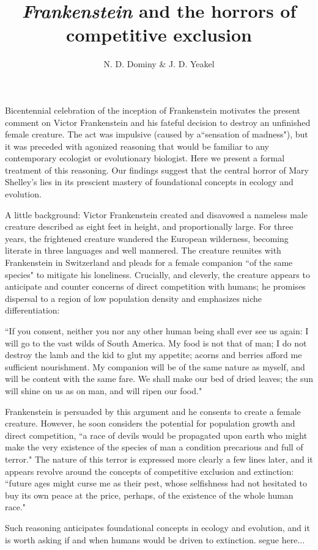\documentclass{article}[11pt]
\begin{document}
\title{\emph{Frankenstein} and the horrors of competitive exclusion}


\author{N. D. Dominy \& J. D. Yeakel}

%
%


\maketitle

Bicentennial celebration of the inception of Frankenstein motivates the present comment on Victor Frankenstein and his fateful decision to destroy an unfinished female creature. The act was impulsive (caused by a``sensation of madness"), but it was preceded with agonized reasoning that would be familiar to any contemporary ecologist or evolutionary biologist. Here we present a formal treatment of this reasoning. Our findings suggest that the central horror of Mary Shelley's lies in its prescient mastery of foundational concepts in ecology and evolution.



A little background: Victor Frankenstein created and disavowed a nameless male creature described as eight feet in height, and proportionally large. For three years, the frightened creature wandered the European wilderness, becoming literate in three languages and well mannered. The creature reunites with Frankenstein in Switzerland and pleads for a female companion ``of the same species" to mitigate his loneliness. Crucially, and cleverly, the creature appears to anticipate and counter concerns of direct competition with humans; he promises dispersal to a region of low population density and emphasizes niche differentiation:


\begin{displayquote}
``If you consent, neither you nor any other human being shall ever see us again: I will go to the vast wilds of South America. My food is not that of man; I do not destroy the lamb and the kid to glut my appetite; acorns and berries afford me sufficient nourishment. My companion will be of the same nature as myself, and will be content with the same fare. We shall make our bed of dried leaves; the sun will shine on us as on man, and will ripen our food."
\end{displayquote}


Frankenstein is persuaded by this argument and he consents to create a female creature. However, he soon considers the potential for population growth and direct competition, ``a race of devils would be propagated upon earth who might make the very existence of the species of man a condition precarious and full of terror." The nature of this terror is expressed more clearly a few lines later, and it appears revolve around the concepts of competitive exclusion and extinction: ``future ages might curse me as their pest, whose selfishness had not hesitated to buy its own peace at the price, perhaps, of the existence of the whole human race."



Such reasoning anticipates foundational concepts in ecology and evolution, and it is worth asking if and when humans would be driven to extinction. segue here...
\end{document}
